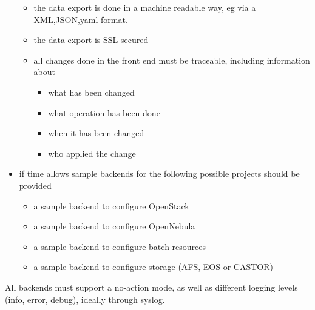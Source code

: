 \begin{itemize}
\begin{itemize}
\item the data export is done in a machine readable way, eg via a XML,JSON,yaml format. 
\item the data export is SSL secured 
\item all changes done in the front end must be traceable, including information about 
\begin{itemize}
 \item what has been changed 
 \item what operation has been done 
 \item when it has been changed
 \item who applied the change
\end{itemize}
\end{itemize}
\item if time allows sample backends for the following possible projects should be provided
\begin{itemize}
\item a sample backend to configure OpenStack
\item a sample backend to configure OpenNebula
\item a sample backend to configure batch resources 
\item a sample backend to configure storage (AFS, EOS or CASTOR) 
\end{itemize}
\end{itemize}
All backends must support a no-action mode, as well as different logging levels (info, error, debug), ideally through syslog.

